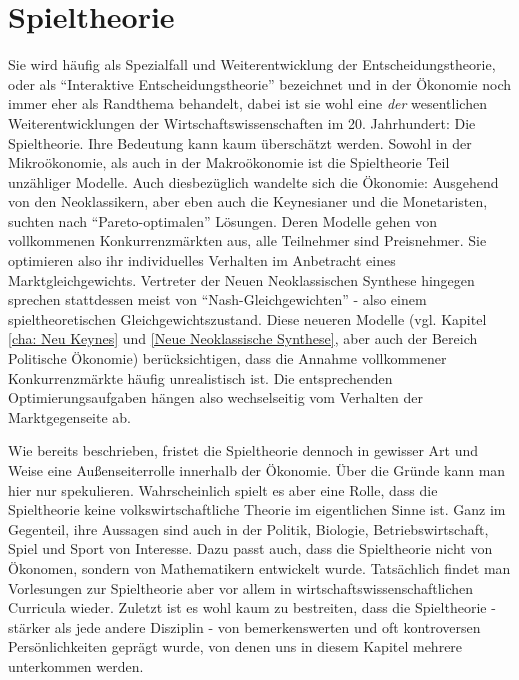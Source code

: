 %
%
%

\chapter{Spieltheorie} \label{cha: Spieltheorie}
\label{Spieltheorie}

Sie wird häufig als Spezialfall und Weiterentwicklung der Entscheidungstheorie, oder als "`Interaktive Entscheidungstheorie"' bezeichnet und in der Ökonomie noch immer eher als Randthema behandelt, dabei ist sie wohl eine \textit{der} wesentlichen Weiterentwicklungen der Wirtschaftswissenschaften im 20. Jahrhundert: Die Spieltheorie. Ihre Bedeutung kann kaum überschätzt werden. Sowohl in der Mikroökonomie, als auch in der Makroökonomie ist die Spieltheorie Teil unzähliger Modelle. Auch diesbezüglich wandelte sich die Ökonomie: Ausgehend von den Neoklassikern, aber eben auch die Keynesianer und die Monetaristen, suchten nach "`Pareto-optimalen"' Lösungen. Deren Modelle gehen von vollkommenen Konkurrenzmärkten aus, alle Teilnehmer sind Preisnehmer. Sie optimieren also ihr individuelles Verhalten im Anbetracht eines Marktgleichgewichts. Vertreter der Neuen Neoklassischen Synthese hingegen sprechen stattdessen meist von "`Nash-Gleichgewichten"' - also einem spieltheoretischen Gleichgewichtszustand.  Diese neueren Modelle (vgl. Kapitel \ref{cha: Neu Keynes} und \ref{Neue Neoklassische Synthese}, aber auch der Bereich Politische Ökonomie) berücksichtigen, dass die Annahme vollkommener Konkurrenzmärkte häufig unrealistisch ist. Die entsprechenden Optimierungsaufgaben hängen also wechselseitig vom Verhalten der Marktgegenseite ab. 

Wie bereits beschrieben, fristet die Spieltheorie dennoch in gewisser Art und Weise eine Außenseiterrolle innerhalb der Ökonomie. Über die Gründe kann man hier nur spekulieren. Wahrscheinlich spielt es aber eine Rolle, dass die Spieltheorie keine volkswirtschaftliche Theorie im eigentlichen Sinne ist. Ganz im Gegenteil, ihre Aussagen sind auch in der Politik, Biologie, Betriebswirtschaft, Spiel und Sport von Interesse. Dazu passt auch, dass die Spieltheorie nicht von Ökonomen, sondern von Mathematikern entwickelt wurde. Tatsächlich findet man Vorlesungen zur Spieltheorie aber vor allem in wirtschaftswissenschaftlichen Curricula wieder. Zuletzt ist es wohl kaum zu bestreiten, dass die Spieltheorie - stärker als jede andere Disziplin - von bemerkenswerten und oft kontroversen Persönlichkeiten geprägt wurde, von denen uns in diesem Kapitel mehrere unterkommen werden.

